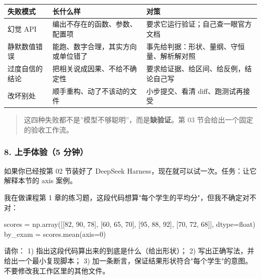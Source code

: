 \documentclass[
]{article}
\newenvironment{Shaded}{}{}
\newcommand{\NormalTok}[1]{#1}
\newcounter{none} %
\begin{document}
{\def\LTcaptype{none} %
\begin{longtable}[]{@{}
  >{\raggedright\arraybackslash}p{}
  >{\raggedright\arraybackslash}p{}
  >{\raggedright\arraybackslash}p{}@{}}
\toprule\noalign{}
\begin{minipage}[b]{\linewidth}\raggedright
失败模式
\end{minipage} & \begin{minipage}[b]{\linewidth}\raggedright
长什么样
\end{minipage} & \begin{minipage}[b]{\linewidth}\raggedright
对策
\end{minipage} \\
\midrule\noalign{}
\endhead
\bottomrule\noalign{}
\endlastfoot
幻觉 API & 编出不存在的函数、参数、配置项 &
要求它运行验证；自己查一眼官方文档 \\
静默数值错误 & 能跑、数字合理，其实方向或单位错了 &
事先给判据：形状、量纲、守恒量、解析解对照 \\
过度自信的结论 & 把相关说成因果、不给不确定性 &
要求给证据、给区间、给反例，结论自己写 \\
改坏别处 & 顺手重构、动了不该动的文件 & 小步提交、看清
diff、跑测试再接受 \\
\end{longtable}
}

\begin{quote}
这四种失败都不是''模型不够聪明''，而是\textbf{缺验证}。第 03
节会给出一个固定的验收工作流。
\end{quote}

\subsubsection{8. 上手体验（5
分钟）}\label{ux4e0aux624bux4f53ux9a8c5-ux5206ux949f}

如果你已经按第 02 节装好了 DeepSeek
Harness，现在就可以试一次。任务：让它解释本节的 axis 案例。

\begin{Shaded}
\begin{Highlighting}[]
\NormalTok{我在做课程第 1 章的练习题，这段代码想算"每个学生的平均分"，但我不确定对不对：}

\NormalTok{scores = np.array([[82, 90, 78], [60, 65, 70], [95, 88, 92], [70, 72, 68]], dtype=float)}
\NormalTok{by\_exam = scores.mean(axis=0)}

\NormalTok{请你：}
\NormalTok{1) 指出这段代码算出来的到底是什么（给出形状）；}
\NormalTok{2) 写出正确写法，并给出一个最小复现脚本；}
\NormalTok{3) 加一条断言，保证结果形状符合"每个学生"的意图。}
\NormalTok{不要修改我工作区里的其他文件。}
\end{Highlighting}
\end{Shaded}
\end{document}
